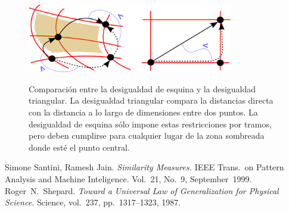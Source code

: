 \documentclass[spanish]{article}
\begin{document}
\begin{figure}[t]
  \centering
  \includegraphics[width=0.8\textwidth]{imagenes/esquina.png}
  \label{fig:esquina}
  \caption{\small %
    Comparación entre la desigualdad de esquina y la desigualdad
    triangular.  La desigualdad triangular compara la distancias directa con
    la distancia a lo largo de dimensiones entre dos puntos.  La desigualdad de
    esquina sólo impone estas restricciones por tramos, pero deben cumplirse
    para cualquier lugar de la zona sombreada donde esté el punto central.
  }
\end{figure}




\begin{thebibliography}{99}
        Simone Santini, Ramesh Jain.
        \emph{Similarity Measures.}
        IEEE Trans.~on Pattern Analysis and Machine Inteligence.
        Vol.~21, No.~9, September~1999.
        Roger~{}N.~Shepard.
        \emph{Toward a Universal Law of Generalization for Physical Science.}
        Science, vol.~237, pp.~1317--1323, 1987.
\end{thebibliography}
\end{document}

